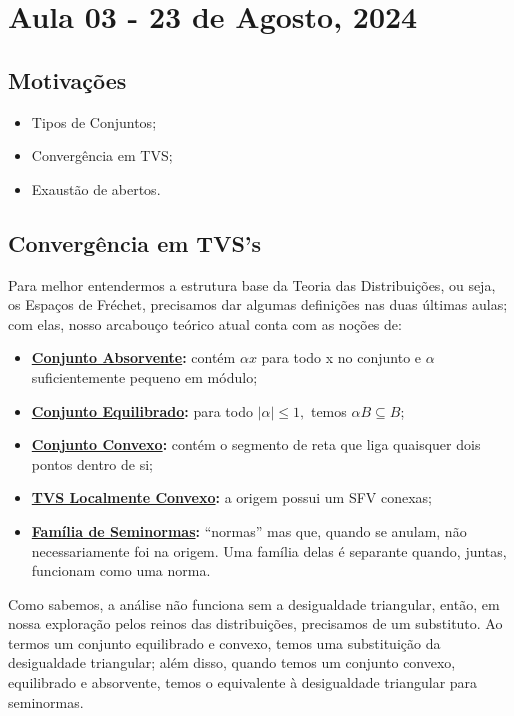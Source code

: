 \documentclass[../distribution_theory_notes.tex]{subfiles}
\begin{document}
\section{Aula 03 - 23 de Agosto, 2024}
\subsection{Motivações}
\begin{itemize}
 \item Tipos de Conjuntos; 
 \item Convergência em TVS;
 \item Exaustão de abertos.
\end{itemize}
\subsection{Convergência em TVS's}
  Para melhor entendermos a estrutura base da Teoria das Distribuições, ou seja, os Espaços de Fréchet, precisamos dar algumas definições nas duas últimas aulas; com elas, nosso arcabouço teórico atual conta com as noções de: 
 \begin{itemize}
   \item \textbf{\underline{Conjunto Absorvente}:} contém \(\alpha x\) para todo x no conjunto e \(\alpha \) suficientemente pequeno em módulo; 
   \item \textbf{\underline{Conjunto Equilibrado}:} para todo \(|\alpha |\leq 1,\) temos \(\alpha B \subseteq B\);
   \item \textbf{\underline{Conjunto Convexo}:} contém o segmento de reta que liga quaisquer dois pontos dentro de si;
   \item \textbf{\underline{TVS Localmente Convexo}:} a origem possui um SFV conexas;
   \item \textbf{\underline{Família de Seminormas}:} ``normas'' mas que, quando se anulam, não necessariamente foi na origem. Uma família delas é separante quando, juntas, funcionam como uma norma.
 \end{itemize}
   \begin{tcolorbox}[
   skin=enhanced,
   title=Observação,
   fonttitle=\bfseries,
 colframe=black,
   colbacktitle=cyan!75!white, 
   colback=cyan!15,
   colbacklower=black,
 coltitle=black,
   drop fuzzy shadow,
   ]
   Como sabemos, a análise não funciona sem a desigualdade triangular, então, em nossa exploração pelos reinos das distribuições, precisamos de um substituto. Ao termos um conjunto equilibrado e convexo, temos uma substituição da desigualdade triangular; além disso, quando temos um conjunto convexo, equilibrado e absorvente, temos o equivalente à desigualdade triangular para seminormas. 
   \end{tcolorbox}
\end{document}
